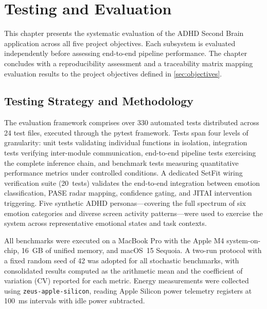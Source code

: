 \chapter{Testing and Evaluation}
\label{ch:testing-evaluation}

This chapter presents the systematic evaluation of the ADHD Second Brain application across all five project objectives. Each subsystem is evaluated independently before assessing end-to-end pipeline performance. The chapter concludes with a reproducibility assessment and a traceability matrix mapping evaluation results to the project objectives defined in \cref{sec:objectives}.

\section{Testing Strategy and Methodology}
\label{sec:testing-strategy}

The evaluation framework comprises over 330 automated tests distributed across 24 test files, executed through the pytest framework. Tests span four levels of granularity: unit tests validating individual functions in isolation, integration tests verifying inter-module communication, end-to-end pipeline tests exercising the complete inference chain, and benchmark tests measuring quantitative performance metrics under controlled conditions. A dedicated SetFit wiring verification suite (20~tests) validates the end-to-end integration between emotion classification, PASE radar mapping, confidence gating, and JITAI intervention triggering. Five synthetic ADHD personas---covering the full spectrum of six emotion categories and diverse screen activity patterns---were used to exercise the system across representative emotional states and task contexts.

All benchmarks were executed on a MacBook Pro with the Apple M4 system-on-chip, 16~GB of unified memory, and macOS~15 Sequoia. A two-run protocol with a fixed random seed of 42 was adopted for all stochastic benchmarks, with consolidated results computed as the arithmetic mean and the coefficient of variation (CV) reported for each metric. Energy measurements were collected using \texttt{zeus-apple-silicon}, reading Apple Silicon power telemetry registers at 100~ms intervals with idle power subtracted.

